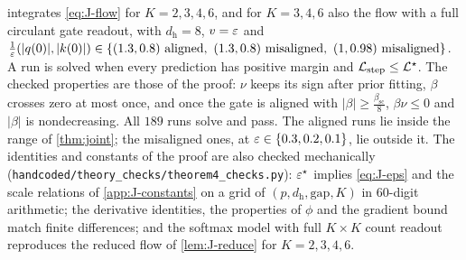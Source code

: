 \label{app:J-generalK}

 integrates \cref{eq:J-flow} for $K=2,3,4,6$, and for $K=3,4,6$ also the flow with a full circulant gate readout, with
$d_{\mathrm h}=8$, $v=\varepsilon$ and $\frac{1}{\varepsilon}(|q(0)|,|k(0)|)\in\{(1.3,0.8)\text{ aligned},\ (1.3,0.8)\text{ misaligned},\ (1,0.98)\text{ misaligned}\}$. A run is solved when every
prediction has positive margin and $\mathcal L_{\mathrm{step}}\le \mathcal L^\star$. The checked properties are those of the proof: $\nu$ keeps its sign after prior
fitting, $\beta$ crosses zero at most once, and once the gate is aligned with $|\beta|\ge\frac{\beta_{\mathrm{sc}}}{8}$, $\beta \nu\le0$ and $|\beta|$ is nondecreasing. All $189$ runs
solve and pass. The aligned runs lie inside the range of \cref{thm:joint}; the misaligned ones, at $\varepsilon\in\{0.3,0.2,0.1\}$, lie outside it.
The identities and constants of the proof are also checked mechanically (\texttt{handcoded/theory\_checks/theorem4\_checks.py}): $\varepsilon^\star$
implies \cref{eq:J-eps} and the scale relations of \cref{app:J-constants} on a grid of $(p,d_{\mathrm h},\mathrm{gap},K)$ in $60$-digit arithmetic; the
derivative identities, the properties of $\phi$ and the gradient bound match finite differences; and the softmax model with full
$K\times K$ count readout reproduces the reduced flow of \cref{lem:J-reduce} for $K=2,3,4,6$.

